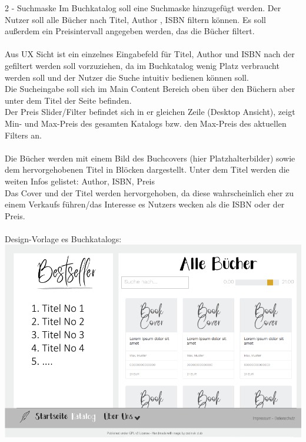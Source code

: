 \documentclass[a4paper]{article}
\begin{document}
\begin{exercise}{2 - Suchmaske} 
Im Buchkatalog soll eine Suchmaske hinzugefügt werden.
Der Nutzer soll alle Bücher nach Titel, Author , ISBN filtern können.
Es soll außerdem ein Preisintervall angegeben werden, das die Bücher filtert.\\\\
Aus UX Sicht ist ein einzelnes Eingabefeld für Titel, Author und ISBN nach der gefiltert werden soll vorzuziehen, da im Buchkatalog wenig Platz verbraucht werden soll und der Nutzer die Suche intuitiv bedienen können soll.\\
Die Sucheingabe soll sich im Main Content Bereich oben über den  Büchern aber unter dem Titel der Seite befinden.\\
Der Preis Slider/Filter befindet sich in er gleichen Zeile (Desktop Ansicht), zeigt Min- und Max-Preis des gesamten Katalogs bzw. den Max-Preis des aktuellen Filters an.\\\\
Die Bücher werden mit einem Bild des Buchcovers (hier Platzhalterbilder) sowie dem hervorgehobenen Titel in Blöcken dargestellt.
Unter dem Titel werden die weiten Infos gelistet: Author, ISBN, Preis\\
Das Cover und der Titel werden hervorgehoben, da diese wahrscheinlich eher zu einem Verkaufs führen/das Interesse es Nutzers wecken als die ISBN oder der Preis.\\\\
Design-Vorlage es Buchkatalogs:\\
\includegraphics[scale=0.5]{../10_bookstore_store_redesign.png}


\end{exercise}
\end{document}
